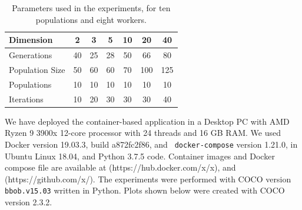 \documentclass[runningheads]{llncs}
\begin{document}
\begin{table}[h!tb]
  \small
  \caption{Parameters used in the experiments, for ten populations and eight workers.
  }
  \label{tab:params:10}
  \vspace{0.25cm}
  \centering
  \small
  \begin{tabular}{|l|c|c|c|c|c|c|}
    \hline
    Dimension        & 2  & 3  & 5  & 10 & 20  & 40  \\ \hline
    Generations      & 40 & 25 & 28 & 50 & 66  & 80  \\ \hline
    Population Size  & 50 & 60 & 60 & 70 & 100 & 125 \\ \hline
    Populations      & 10 & 10 & 10 & 10 & 10  & 10  \\ \hline
    Iterations       & 10 & 20 & 30 & 30 & 30  & 40  \\ \hline
  \end{tabular}
\end{table}

We have deployed the container-based application in a Desktop PC with
AMD Ryzen 9 3900x 12-core processor with 24 threads and 16 GB RAM. We
used Docker version 19.03.3, build a872fc2f86, and {\tt
docker-compose} version 1.21.0, in Ubuntu Linux 18.04, and Python
3.7.5 code. Container images and Docker compose file are available at
(https://hub.docker.com/x/x), and (https://github.com/x/).  The
experiments were performed with COCO \cite{hansen2016coco} version
{\tt bbob.v15.03} written in Python. Plots shown below were created
with COCO version 2.3.2.
\end{document}
